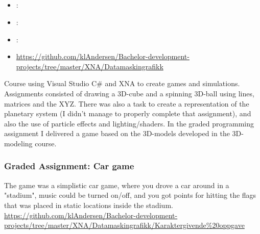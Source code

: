\subsection[Computer Graphics]{}
\label{sec:comp_grahphics}
\begin{itemize} 
	\item {}: 
	\item {}: 
	\item {}: 
	\item {} \url{https://github.com/klAndersen/Bachelor-development-projects/tree/master/XNA/Datamaskingrafikk}
\end{itemize} 
Course using Visual Studio C\# and XNA to create games and simulations. 
Assignments consisted of drawing a 3D-cube and a spinning 3D-ball using lines, matrices and the XYZ. 
There was also a task to create a representation of the planetary system (I didn't manage to properly complete that assignment), and also the use of particle effects and lighting/shaders. 
In the graded programming assignment I delivered a game based on the 3D-models developed in the 3D-modeling course. 

\subsubsection{Graded Assignment: Car game}
\label{sec:comp_grahphics_graded_assignment}
The game was a simplistic car game, where you drove a car around in a "stadium", music could be turned on/off, 
and you got points for hitting the flags that was placed in static locations inside the stadium.
\vspace{0.5em}\newline
{} \url{https://github.com/klAndersen/Bachelor-development-projects/tree/master/XNA/Datamaskingrafikk/Karaktergivende%20oppgave}

